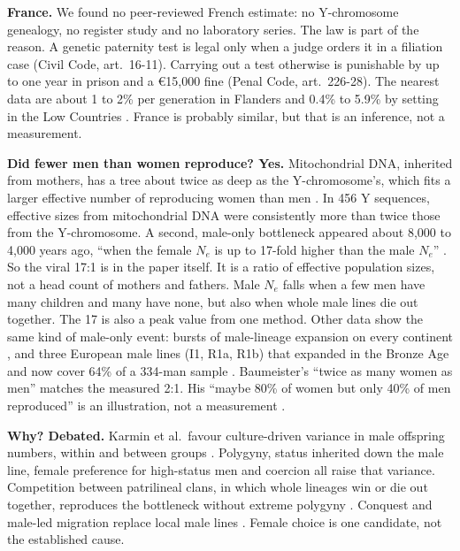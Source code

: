 \documentclass[conference,a4paper]{IEEEtran}
\begin{document}
\textbf{France.} We found no peer-reviewed French estimate: no Y-chromosome genealogy, no register study and no laboratory series. The law is part of the reason. A genetic paternity test is legal only when a judge orders it in a filiation case (Civil Code, art.~16-11). Carrying out a test otherwise is punishable by up to one year in prison and a \euro{}15,000 fine (Penal Code, art.~226-28). The nearest data are about 1 to 2\% per generation in Flanders \cite{larmuseau2013} and 0.4\% to 5.9\% by setting in the Low Countries \cite{larmuseau2019}. France is probably similar, but that is an inference, not a measurement.

\textbf{Did fewer men than women reproduce? Yes.} Mitochondrial DNA, inherited from mothers, has a tree about twice as deep as the Y-chromosome's, which fits a larger effective number of reproducing women than men \cite{wilder2004}. In 456 Y sequences, effective sizes from mitochondrial DNA were consistently more than twice those from the Y-chromosome. A second, male-only bottleneck appeared about 8,000 to 4,000 years ago, ``when the female $N_e$ is up to 17-fold higher than the male $N_e$'' \cite{karmin2015}. So the viral 17:1 is in the paper itself. It is a ratio of effective population sizes, not a head count of mothers and fathers. Male $N_e$ falls when a few men have many children and many have none, but also when whole male lines die out together. The 17 is also a peak value from one method. Other data show the same kind of male-only event: bursts of male-lineage expansion on every continent \cite{poznik2016}, and three European male lines (I1, R1a, R1b) that expanded in the Bronze Age and now cover 64\% of a 334-man sample \cite{batini2015}. Baumeister's ``twice as many women as men'' matches the measured 2:1. His ``maybe 80\% of women but only 40\% of men reproduced'' is an illustration, not a measurement \cite{baumeister2010}.

\textbf{Why? Debated.} Karmin et al.\ favour culture-driven variance in male offspring numbers, within and between groups \cite{karmin2015}. Polygyny, status inherited down the male line, female preference for high-status men and coercion all raise that variance. Competition between patrilineal clans, in which whole lineages win or die out together, reproduces the bottleneck without extreme polygyny \cite{zeng2018}. Conquest and male-led migration replace local male lines \cite{karmin2015,batini2015}. Female choice is one candidate, not the established cause.
\end{document}

